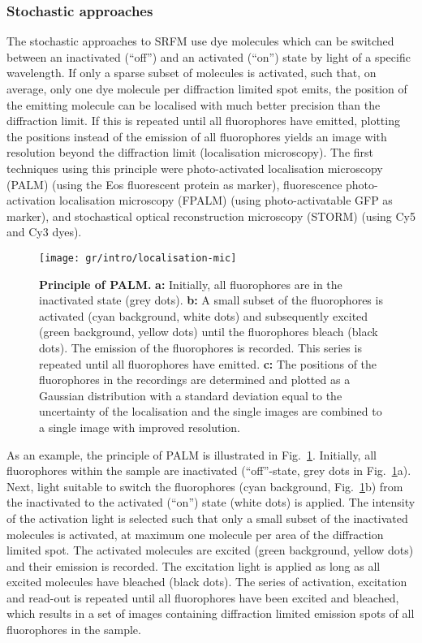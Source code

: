 \subsubsection{Stochastic approaches}
\label{sec:smlm}
The stochastic approaches to SRFM use dye molecules which can be switched
between an inactivated (``off'') and an activated (``on'') state by light of a
specific wavelength. If only a sparse subset of molecules is activated, such
that, on average, only one dye molecule per diffraction limited spot emits,
the position of the emitting molecule can be localised with much better
precision than the diffraction limit. If this is repeated until all
fluorophores have emitted, plotting the positions instead of the emission of
all fluorophores yields an image with resolution beyond the diffraction
limit (localisation microscopy). The first techniques using this principle
were photo-activated localisation microscopy (PALM) \cite{Betzig2006} (using
the Eos fluorescent protein \cite{Wiedenmann2004} as marker), fluorescence
photo-activation localisation microscopy (FPALM) \cite{Hess2006} (using
photo-activatable GFP as marker), and stochastical
optical reconstruction microscopy (STORM) \cite{Rust2006} (using Cy5 and Cy3
dyes).

\begin{figure}
  \centering
  \texttt{[image: gr/intro/localisation-mic]}
  \caption{%
    \textbf{Principle of PALM.}
    \textbf{a:} Initially, all fluorophores are in the inactivated state (grey
    dots).
    \textbf{b:} A small subset of the fluorophores is activated (cyan
    background, white dots) and subsequently excited (green background, yellow
    dots) until the fluorophores bleach (black dots). The emission of the
    fluorophores is recorded. This series is repeated until all fluorophores
    have emitted.
    \textbf{c:} The positions of the fluorophores in the recordings are
    determined and plotted as a Gaussian distribution with a standard
    deviation equal to the uncertainty of the localisation and the single
    images are combined to a single image with improved resolution.
  }
  \label{fig:lm}
\end{figure}

As an example, the principle of PALM is illustrated in Fig.~\ref{fig:lm}. Initially,
all fluorophores within the sample are inactivated (``off''-state, grey dots
in Fig.~\ref{fig:lm}a). Next, light suitable to switch the fluorophores (cyan
background, Fig.~\ref{fig:lm}b) from the inactivated to the activated (``on'')
state (white dots) is applied. The intensity of the activation light is
selected such that only a small subset of the inactivated molecules is
activated, at maximum one molecule per area of the diffraction limited
spot. The activated molecules are excited (green background, yellow dots) and
their emission is recorded. The excitation light is applied as long as all
excited molecules have bleached (black dots). The series of activation,
excitation and read-out is repeated until all fluorophores have been excited
and bleached, which results in a set of images containing diffraction limited
emission spots of all fluorophores in the sample.

